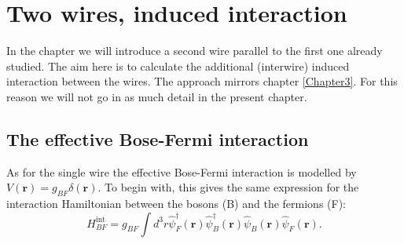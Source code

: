 
\chapter{Two wires, induced interaction} %

\label{Chapter8} %


In the chapter we will introduce a second wire parallel to the first one already studied. The aim here is to calculate the additional (interwire) induced interaction between the wires. The approach mirrors chapter \ref{Chapter3}. For this reason we will not go in as much detail in the present chapter.
\section{The effective Bose-Fermi interaction} 
As for the single wire the effective Bose-Fermi interaction is modelled by $V(\mathbf{r}) = g_{BF}\delta(\mathbf{r})$. To begin with, this gives the same expression for the interaction Hamiltonian between the bosons (B) and the fermions (F):
\begin{equation}
H_{BF}^\text{int} = g_{BF}\int d^3 r \hat{\psi}_F^\dagger(\mathbf{r}) \hat{\psi}_B^\dagger(\mathbf{r})\hat{\psi}_B(\mathbf{r})\hat{\psi}_F(\mathbf{r}).
\end{equation}

